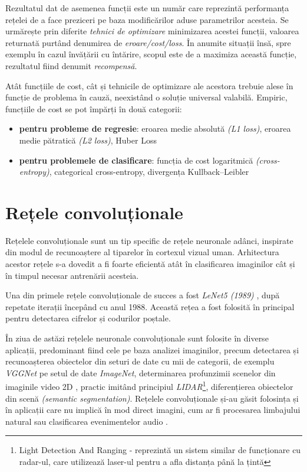 Rezultatul dat de asemenea funcții este un număr care reprezintă performanța rețelei de a face preziceri pe baza modificărilor aduse parametrilor acesteia. Se urmărește prin diferite \textit{tehnici de optimizare} minimizarea acestei funcții, valoarea returnată purtând denumirea de \textit{eroare/cost/loss}. În anumite situații însă, spre exemplu în cazul învățării cu întărire, scopul este de a maximiza această funcție, rezultatul fiind denumit \textit{recompensă}.

Atât funcțiile de cost, cât și tehnicile de optimizare ale acestora trebuie alese în funcție de problema în cauză, neexistând o soluție universal valabilă. Empiric, funcțiile de cost se pot împărți în două categorii:
\begin{itemize}
\item \textbf{pentru probleme de regresie}: eroarea medie absolută \textit{(L1 loss)}, eroarea medie pătratică \textit{(L2 loss)},  Huber Loss
\item \textbf{pentru problemele de clasificare}: funcția de cost logaritmică \textit{(cross-entropy)}, categorical cross-entropy, divergența Kullback–Leibler
\end{itemize}

\section{Rețele convoluționale}\label{sec:reteleconv}
Rețelele convoluționale sunt un tip specific de rețele neuronale adânci, inspirate din modul de recunoaștere al tiparelor în cortexul vizual uman. Arhitectura acestor rețele s-a dovedit a fi foarte eficientă atât în clasificarea imaginilor cât și în timpul necesar antrenării acesteia.

Una din primele rețele convoluționale de succes a fost \textit{LeNet5 (1989)} \cite{LeNet5}, după repetate iterații începând cu anul 1988. Această rețea a fost folosită în principal pentru detectarea cifrelor și codurilor poștale.

În ziua de astăzi rețelele neuronale convoluționale sunt folosite în diverse aplicații, predominant fiind cele pe baza analizei imaginilor, precum detectarea și recunoașterea obiectelor din seturi de date cu mii de categorii, de exemplu \textit{VGGNet} \cite{simonyan2014deep} pe setul de date \textit{ImageNet}, determinarea profunzimii scenelor din imaginile video 2D \cite{zhou2017unsupervised}, practic imitând principiul \textit{LIDAR}\footnote{Light Detection And Ranging - reprezintă un sistem similar de funcționare cu radar-ul, care utilizează laser-ul pentru a afla distanța până la țintă}, diferențierea obiectelor din scenă \textit{(semantic segmentation)}. Rețelele convoluționale și-au găsit folosința și în aplicații care nu implică în mod direct imagini, cum ar fi procesarea limbajului natural sau clasificarea evenimentelor audio \cite{cnnaudioclass}.

